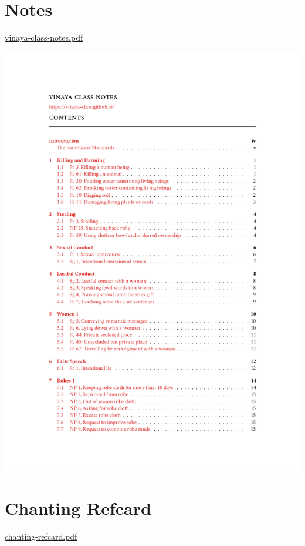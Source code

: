 \section{Notes}

\href{./includes/docs/vinaya-class-notes.pdf}{vinaya-class-notes.pdf}

\href{./includes/docs/vinaya-class-notes.pdf}{\includegraphics{./includes/docs/vinaya-class-notes-thumb.png}}

\section{Chanting Refcard}

\href{./includes/docs/chanting-refcard.pdf}{chanting-refcard.pdf}

